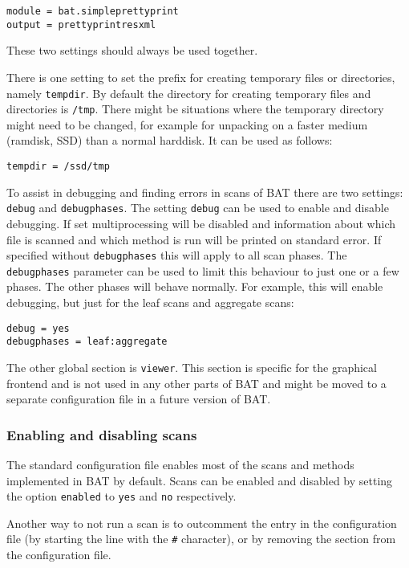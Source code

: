 \documentclass[10pt]{article}
\begin{document}
\begin{verbatim}
module = bat.simpleprettyprint
output = prettyprintresxml
\end{verbatim}

These two settings should always be used together.

There is one setting to set the prefix for creating temporary files or
directories, namely \texttt{tempdir}. By default the directory for creating
temporary files and directories is \texttt{/tmp}. There might be situations
where the temporary directory might need to be changed, for example for
unpacking on a faster medium (ramdisk, SSD) than a normal harddisk. It can be
used as follows:

\begin{verbatim}
tempdir = /ssd/tmp
\end{verbatim}

To assist in debugging and finding errors in scans of BAT there are two
settings: \texttt{debug} and \texttt{debugphases}. The setting \texttt{debug}
can be used to enable and disable debugging. If set multiprocessing will be
disabled and information about which file is scanned and which method is run
will be printed on standard error. If specified without \texttt{debugphases}
this will apply to all scan phases. The \texttt{debugphases} parameter can be
used to limit this behaviour to just one or a few phases. The other phases will
behave normally. For example, this will enable debugging, but just for the
leaf scans and aggregate scans:

\begin{verbatim}
debug = yes
debugphases = leaf:aggregate
\end{verbatim}

The other global section is \texttt{viewer}. This section is specific for the
graphical frontend and is not used in any other parts of BAT and might be moved
to a separate configuration file in a future version of BAT.

\subsubsection{Enabling and disabling scans}

The standard configuration file enables most of the scans and methods
implemented in BAT by default. Scans can be enabled and disabled by setting the
option \texttt{enabled} to \texttt{yes} and \texttt{no} respectively.

Another way to not run a scan is to outcomment the entry in the configuration
file (by starting the line with the \texttt{\#} character), or by removing the
section from the configuration file.
\end{document}
